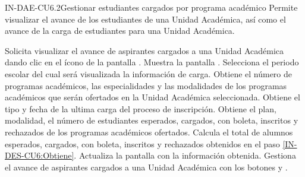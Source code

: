 \begin{UseCase}{IN-DAE-CU6.2}{Gestionar estudiantes cargados por programa académico}{
	Permite visualizar el avance de los estudiantes de una Unidad Académica, así como el avance de la carga de estudiantes para una Unidad Académica.
}
{	}
\end{UseCase}


\begin{UCtrayectoria}
	\UCpaso [\UCactor] Solicita visualizar el avance de aspirantes cargados a una Unidad Académica dando clic en el ícono de la pantalla .
	\UCpaso Muestra la pantalla .
	\UCpaso [\UCactor] Selecciona el periodo escolar del cual será visualizada la información de carga.
	\UCpaso Obtiene el número de programas académicos, las especialidades y las modalidades de los programas académicos que serán ofertados en la Unidad Académica seleccionada.
	\UCpaso Obtiene el tipo y fecha de la ultima carga del proceso de inscripción.
	\UCpaso \label{IN-DES-CU6:Obtiene} Obtiene el plan, modalidad, el número de estudiantes esperados, cargados, con boleta, inscritos y rechazados de los programas académicos ofertados.
	\UCpaso Calcula el total de alumnos esperados, cargados, con boleta, inscritos y rechazados obtenidos en el paso \ref{IN-DES-CU6:Obtiene}.
	\UCpaso \label{IN-DAE-CU6:Gestiona} Actualiza la pantalla  con la información obtenida.
	\UCpaso [\UCactor] Gestiona el avance de aspirantes cargados a una Unidad Académica con los botones  y \IUVer. 
\end{UCtrayectoria}

